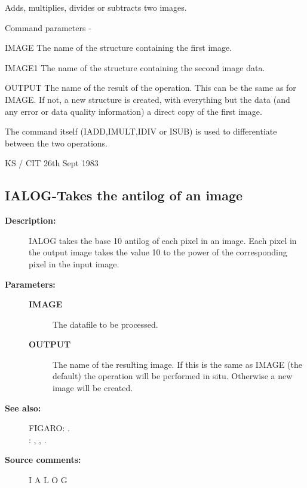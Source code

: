 \begin{description}
\begin{description}
\begin{terminalv}
 Adds, multiplies, divides or subtracts two images.

 Command parameters -

 IMAGE  The name of the structure containing the first image.

 IMAGE1 The name of the structure containing the second
        image data.

 OUTPUT The name of the result of the operation.  This can
        be the same as for IMAGE.  If not, a new structure
        is created, with everything but the data (and any error
        or data quality information) a direct copy of the first
        image.

 The command itself (IADD,IMULT,IDIV or ISUB) is used to
 differentiate between the two operations.

                                  KS / CIT 26th Sept 1983
\end{terminalv}
\end{description}
\subsection{IALOG-\label{IALOG}Takes the antilog of an image}
\begin{description}

\item [\textbf{Description:}]
 IALOG takes the base 10 antilog of each pixel in an image.
 Each pixel in the output image takes the value 10 to the power
 of the corresponding pixel in the input image.

\item [\textbf{Parameters:}]
\begin{description}
\item [\textbf{IMAGE}]
 The datafile to be processed.
\item [\textbf{OUTPUT}]
 The name of the resulting image.  If this is the
 same as IMAGE (the default) the operation will be
 performed in situ.  Otherwise a new image will be
 created.
\end{description}

\item [\textbf{See also:}]
FIGARO: .\\
: , , .\\

\item [\textbf{Source comments:}]
\begin{terminalv}
 I A L O G


\end{terminalv}
\end{description}
\end{description}
